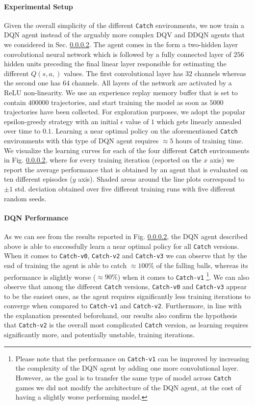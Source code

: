 \paragraph{Experimental Setup}
Given the overall simplicity of the different \texttt{Catch} environments, we now train a DQN agent instead of the arguably more complex DQV and DDQN agents that we considered in Sec. \ref{}. The agent comes in the form a two-hidden layer convolutional neural network which is followed by a fully connected layer of $256$ hidden units preceding the final linear layer responsible for estimating the different $Q(s,a,)$ values. The first convolutional layer has $32$ channels whereas the second one has $64$ channels. All layers of the network are activated by a ReLU non-linearity. We use an experience replay memory buffer that is set to contain $400000$ trajectories, and start training the model as soon as $5000$ trajectories have been collected. For exploration purposes, we adopt the popular epsilon-greedy strategy with an initial $\epsilon$ value of $1$ which gets linearly annealed over time to $0.1$. Learning a near optimal policy on the aforementioned \texttt{Catch} environments with this type of DQN agent requires $\approx 5$ hours of training time. We visualize the learning curves for each of the four different \texttt{Catch} environments in Fig. \ref{}, where for every training iteration (reported on the $x$ axis) we report the average performance that is obtained by an agent that is evaluated on ten different episodes ($y$ axis). Shaded areas around the line plots correspond to $\pm 1$ std. deviation obtained over five different training runs with five different random seeds.    

\paragraph{DQN Performance}
As we can see from the results reported in Fig. \ref{}, the DQN agent described above is able to successfully learn a near optimal policy for all \texttt{Catch} versions. When it comes to \texttt{Catch-v0}, \texttt{Catch-v2} and \texttt{Catch-v3} we can observe that by the end of training the agent is able to catch $\approx 100\%$ of the falling balls, whereas its performance is slightly worse ($\approx 90\%$) when it comes to \texttt{Catch-v1} \footnote{Please note that the performance on \texttt{Catch-v1} can be improved by increasing the complexity of the DQN agent by adding one more convolutional layer. However, as the goal is to transfer the same type of model across \texttt{Catch} games we did not modify the architecture of the DQN agent, at the cost of having a slightly worse performing model.}. We can also observe that among the different \texttt{Catch} versions, \texttt{Catch-v0} and \texttt{Catch-v3} appear to be the easiest ones, as the agent requires significantly less training iterations to converge when compared to \texttt{Catch-v1} and \texttt{Catch-v2}. Furthermore, in line with the explanation presented beforehand, our results also confirm the hypothesis that \texttt{Catch-v2} is the overall most complicated \texttt{Catch} version, as learning requires significantly more, and potentially unstable, training iterations.

